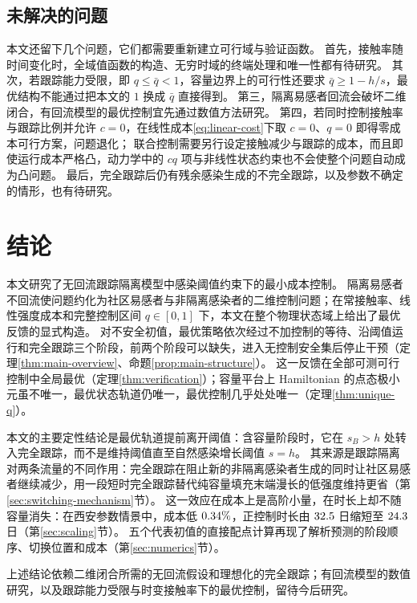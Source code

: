\documentclass[11pt,a4paper,UTF8]{ctexart}
\theoremstyle{definition}
\begin{document}
\subsection{未解决的问题}
\label{sec:open-problems}
本文还留下几个问题，它们都需要重新建立可行域与验证函数。
首先，接触率随时间变化时，全域值函数的构造、无穷时域的终端处理和唯一性都有待研究。
其次，若跟踪能力受限，即 $q\le\bar q<1$，容量边界上的可行性还要求 $\bar q\ge1-h/s$，最优结构不能通过把本文的 $1$ 换成 $\bar q$ 直接得到。
第三，隔离易感者回流会破坏二维闭合，有回流模型的最优控制宜先通过数值方法研究。
第四，若同时控制接触率与跟踪比例并允许 $c=0$，在线性成本\eqref{eq:linear-cost}下取 $c=0$、$q=0$ 即得零成本可行方案，问题退化；
联合控制需要另行设定接触减少与跟踪的成本，而且即使运行成本严格凸，动力学中的 $cq$ 项与非线性状态约束也不会使整个问题自动成为凸问题。
最后，完全跟踪后仍有残余感染生成的不完全跟踪，以及参数不确定的情形，也有待研究。

\section{结论}
\label{sec:conclusions}
本文研究了无回流跟踪隔离模型中感染阈值约束下的最小成本控制。
隔离易感者不回流使问题约化为社区易感者与非隔离感染者的二维控制问题；在常接触率、线性强度成本和完整控制区间 $q\in[0,1]$ 下，本文在整个物理状态域上给出了最优反馈的显式构造。
对不安全初值，最优策略依次经过不加控制的等待、沿阈值运行和完全跟踪三个阶段，前两个阶段可以缺失，进入无控制安全集后停止干预（定理\ref{thm:main-overview}、命题\ref{prop:main-structure}）。
这一反馈在全部可测可行控制中全局最优（定理\ref{thm:verification}）；容量平台上 Hamiltonian 的点态极小元虽不唯一，最优状态轨道仍唯一，最优控制几乎处处唯一（定理\ref{thm:unique-q}）。

本文的主要定性结论是最优轨道提前离开阈值：含容量阶段时，它在 $s_B>h$ 处转入完全跟踪，而不是维持阈值直至自然感染增长阈值 $s=h$。
其来源是跟踪隔离对两条流量的不同作用：完全跟踪在阻止新的非隔离感染者生成的同时让社区易感者继续减少，用一段短时完全跟踪替代纯容量填充末端漫长的低强度维持更省（第\ref{sec:switching-mechanism}节）。
这一效应在成本上是高阶小量，在时长上却不随容量消失：在西安参数情景中，成本低 $0.34\%$，正控制时长由 $32.5$ 日缩短至 $24.3$ 日（第\ref{sec:scaling}节）。
五个代表初值的直接配点计算再现了解析预测的阶段顺序、切换位置和成本（第\ref{sec:numerics}节）。

上述结论依赖二维闭合所需的无回流假设和理想化的完全跟踪；有回流模型的数值研究，以及跟踪能力受限与时变接触率下的最优控制，留待今后研究。
\end{document}
